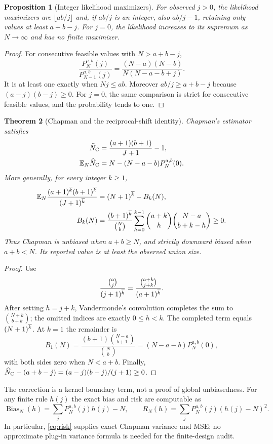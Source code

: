 \documentclass[11pt]{article}
\newtheorem{theorem}{Theorem}[section]
\newtheorem{proposition}[theorem]{Proposition}
\theoremstyle{remark}\newtheorem{remark}[theorem]{Remark}
\newcommand{\E}{\mathbb E}\newcommand{\PP}{\mathbb P}
\begin{document}
\begin{proposition}[Integer likelihood maximizers]\label{prop:mle}
For observed $j>0$, the likelihood maximizers are $\lfloor ab/j\rfloor$
and, if $ab/j$ is an integer, also $ab/j-1$, retaining only values at least
$a+b-j$. For $j=0$, the likelihood increases to its supremum as
$N\to\infty$ and has no finite maximizer.
\end{proposition}
\begin{proof}
For consecutive feasible values with $N>a+b-j$,
\[
 \frac{P_N^{a,b}(j)}{P_{N-1}^{a,b}(j)}
 =\frac{(N-a)(N-b)}{N(N-a-b+j)}.
\]
It is at least one exactly when $Nj\le ab$. Moreover
$ab/j\ge a+b-j$ because $(a-j)(b-j)\ge0$.
For $j=0$, the same comparison is strict for consecutive feasible values,
and the probability tends to one.
\end{proof}

\begin{theorem}[Chapman and the reciprocal-shift identity]\label{thm:chapman}
Chapman's estimator \cite{Chapman1951} satisfies
\begin{align}
 \widehat N_{\rm C}&=\frac{(a+1)(b+1)}{J+1}-1,\label{eq:Chapman}\\
 \E_N\widehat N_{\rm C}
 &=N-(N-a-b)P_N^{a,b}(0).\label{eq:Chapmanbias}
\end{align}
More generally, for every integer $k\ge1$,
\begin{align}\label{eq:shift}
 \E_N\frac{\rise{a+1}{k}\rise{b+1}{k}}{\rise{J+1}{k}}
 &=\rise{N+1}{k}-B_k(N),\\
 B_k(N)&=\frac{\rise{b+1}{k}}{\binom Nb}
 \sum_{h=0}^{k-1}\binom{a+k}{h}\binom{N-a}{b+k-h}\ge0.\nonumber
\end{align}
Thus Chapman is unbiased when $a+b\ge N$, and strictly downward biased
when $a+b<N$. Its reported value is at least the observed union size.
\end{theorem}
\begin{proof}
Use
\[
 \frac{\binom aj}{(j+1)^{\overline{k}}}
 =\frac{\binom{a+k}{j+k}}{(a+1)^{\overline{k}}}.
\]
After setting $h=j+k$, Vandermonde's convolution completes the sum to
$\binom{N+k}{b+k}$; the omitted indices are exactly $0\le h<k$.
The completed term equals $(N+1)^{\overline{k}}$. At $k=1$ the remainder is
\[
 B_1(N)=\frac{(b+1)\binom{N-a}{b+1}}{\binom Nb}
       =(N-a-b)P_N^{a,b}(0),
\]
with both sides zero when $N<a+b$. Finally,
$\widehat N_{\rm C}-(a+b-j)=(a-j)(b-j)/(j+1)\ge0$.
\end{proof}
The correction is a kernel boundary term, not a proof of global unbiasedness.
For any finite rule $h(j)$ the exact bias and risk are computable as
\begin{equation}\label{eq:risk}
 \operatorname{Bias}_N(h)=\sum_jP_N^{a,b}(j)h(j)-N,
 \qquad R_N(h)=\sum_jP_N^{a,b}(j)(h(j)-N)^2.
\end{equation}
In particular, \eqref{eq:risk} supplies exact Chapman variance and MSE;
no approximate plug-in variance formula is needed for the finite-design audit.
\end{document}
